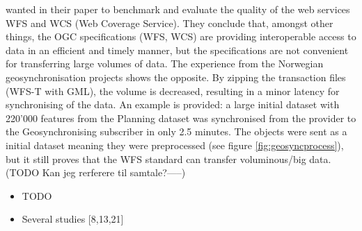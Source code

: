 
\cite{giuliani2013} wanted in their paper to benchmark and evaluate the quality of the web services WFS and WCS (Web Coverage Service). They conclude that, amongst other things, the OGC specifications (WFS, WCS) are providing interoperable access to data in an efficient and timely manner, but the specifications are not convenient for transferring large volumes of data.  The experience from the Norwegian geosynchronisation projects shows the opposite. By zipping the transaction files (WFS-T with GML), the volume is decreased, resulting in a minor latency for synchronising of the data. An example is provided: a large initial dataset with 220'000 features from the Planning dataset was synchronised from the provider to the Geosynchronising subscriber in only 2.5 minutes. The objects were sent as a initial dataset meaning they were preprocessed  (see figure \ref{fig:geosyncprocess}), but it still proves that the WFS standard can transfer voluminous/big data. (TODO Kan jeg rerferere til samtale?-----)

\cite{giuliani2013}



\begin{itemize}
	\item TODO \cite{Zhao2012}
	\item Several studies [8,13,21] \cite{giuliani2013}
\end{itemize}








